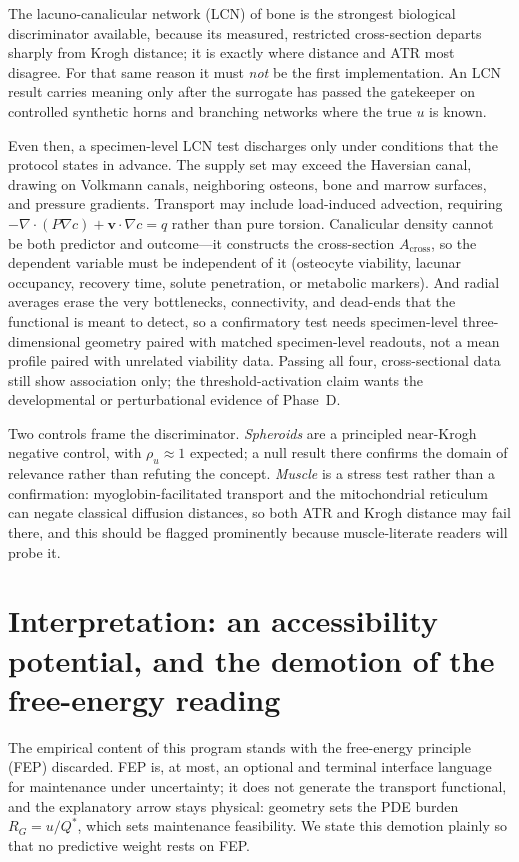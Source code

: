 \documentclass[11pt]{article}
\theoremstyle{remark}
\newcommand{\Acr}{A_{\mathrm{cross}}}
\newcommand{\rhou}{\rho_u}
\newcommand{\RG}{R_{G}}
\newcommand{\Qstar}{Q^{\!*}}
\begin{document}
The lacuno-canalicular network (LCN) of bone is the strongest biological
discriminator available, because its measured, restricted cross-section departs
sharply from Krogh distance; it is exactly where distance and ATR most disagree.
For that same reason it must \emph{not} be the first implementation. An LCN result
carries meaning only after the surrogate has passed the gatekeeper on controlled
synthetic horns and branching networks where the true $u$ is known.

Even then, a specimen-level LCN test discharges only under conditions that the
protocol states in advance. The supply set may exceed the Haversian canal, drawing
on Volkmann canals, neighboring osteons, bone and marrow surfaces, and pressure
gradients. Transport may include load-induced advection, requiring
$-\nabla\!\cdot(P\nabla c)+\mathbf{v}\!\cdot\!\nabla c=q$ rather than pure
torsion. Canalicular density cannot be both predictor and outcome---it constructs
the cross-section $\Acr$, so the dependent variable must be independent of it
(osteocyte viability, lacunar occupancy, recovery time, solute penetration, or
metabolic markers). And radial averages erase the very bottlenecks, connectivity,
and dead-ends that the functional is meant to detect, so a confirmatory test needs
specimen-level three-dimensional geometry paired with matched specimen-level
readouts, not a mean profile paired with unrelated viability data. Passing all
four, cross-sectional data still show association only; the threshold-activation
claim wants the developmental or perturbational evidence of Phase~D.

Two controls frame the discriminator. \emph{Spheroids} are a principled
near-Krogh negative control, with $\rhou\approx1$ expected; a null result there
confirms the domain of relevance rather than refuting the concept.
\emph{Muscle} is a stress test rather than a confirmation: myoglobin-facilitated
transport and the mitochondrial reticulum can negate classical diffusion
distances, so both ATR and Krogh distance may fail there, and this should be
flagged prominently because muscle-literate readers will probe it.

\section{Interpretation: an accessibility potential, and the demotion of the
free-energy reading}\label{sec:interp}

The empirical content of this program stands with the free-energy principle (FEP)
discarded. FEP is, at most, an optional and terminal interface language for
maintenance under uncertainty; it does not generate the transport functional, and
the explanatory arrow stays physical: geometry sets the PDE burden $\RG=u/\Qstar$,
which sets maintenance feasibility. We state this demotion plainly so that no
predictive weight rests on FEP.
\end{document}
